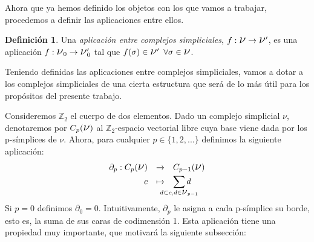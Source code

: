 \documentclass[12pt, a4paper]{article}
\numberwithin{equation}{section}
\theoremstyle{definition}
\newtheorem{defi}{Definición}
\theoremstyle{remark}
\theoremstyle{plain}
\begin{document}
	Ahora que ya hemos definido los objetos con los que vamos a trabajar, 
	procedemos a definir las aplicaciones entre ellos.
	\begin{defi}
		Una \textit{aplicación entre complejos simpliciales}, 
		$f:\text{{\Large $\nu$}} \rightarrow \text{{\Large 
		$\nu$}$^{\prime}$}$, es una aplicación $f:\text{{\Large 
		$\nu$}$_{0}$} \rightarrow \text{{\Large $\nu$}$_{0}^{\prime}$}$ 
		tal que $f(\sigma) \in \text{{\Large $\nu$}$^{\prime}$} 
		\hspace{5pt} \forall \sigma \in \text{{\Large $\nu$}}$.
	\end{defi}
	
	Teniendo definidas las aplicaciones entre complejos simpliciales, 
	vamos a dotar a los complejos simpliciales de una cierta estructura 
	que será de lo más útil para los propósitos del presente trabajo.

	Consideremos $\mathbb{Z}_{2}$ el cuerpo de dos elementos. Dado un 
	complejo simplicial {\Large $\nu$}, denotaremos por 
	$C_{p}(\text{{\Large $\nu$}})$ al $\mathbb{Z}_{2}$-espacio vectorial
	libre cuya base viene dada por los p-símplices de {\Large $\nu$}. 
	Ahora, para cualquier $p \in \{1,2,...\}$ definimos la siguiente 
	aplicación: 
	\begin{equation}
		\label{def:borde}
		\begin{array}{lll}
			\partial_{p}:C_{p}(\text{{\Large $\nu$}}) & 
				\rightarrow & C_{p-1}(\text{{\Large $\nu$}})
				\\[3pt] 
			\multicolumn{1}{r}{c} & \mapsto & \displaystyle 
				\sum_{\mathclap{d \subset c,d \in 
				\text{{\large $\nu$}}_{p-1}}}d
		\end{array} 
	\end{equation}
	Si $p=0$ definimos $\partial_{0}=0$. Intuitivamente, $\partial_{p}$ le
	asigna a cada p-símplice su borde, esto es, la suma de sus caras de
	codimensión 1. Esta aplicación tiene una propiedad muy importante, 
	que motivará la siguiente subsección:
\end{document}
